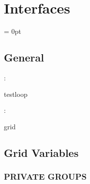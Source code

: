 
\section{Interfaces} 


\parskip = 0pt

\vspace{3mm} \subsection*{General}

: 

testloop
\vspace{2mm}

: 

grid
\vspace{2mm}
\subsection*{Grid Variables}
\vspace{5mm}\subsubsection{PRIVATE GROUPS}

\vspace{5mm}

